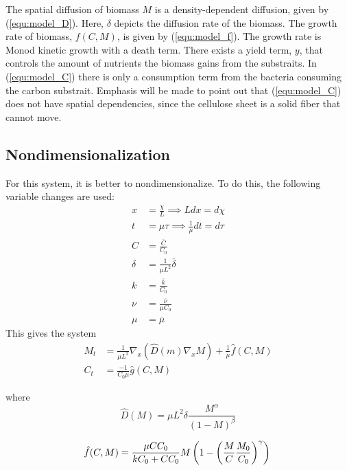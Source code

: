 \documentclass{llncs}
\begin{document}
  The spatial diffusion of biomass $M$ is a density-dependent diffusion, given by (\ref{equ:model_D}).
  Here, $\delta$ depicts the diffusion rate of the biomass.
  The growth rate of biomass, ${f}({C},M)$, is given by (\ref{equ:model_f}). 
  The growth rate is Monod kinetic growth with a death term.
  There exists a yield term, $y$, that controls the amount of nutrients the biomass gains from the substraits. 
  In (\ref{equ:model_C}) there is only a consumption term from the bacteria consuming the carbon substrait. 
  Emphasis will be made to point out that (\ref{equ:model_C}) does not have spatial dependencies, since the cellulose sheet is a solid fiber that cannot move.
  
  \subsection {Nondimensionalization}
  For this system, it is better to nondimensionalize. To do this, the following variable changes are used:
  \begin{align}
    x &= \frac{\chi}{L} \implies L dx = d\chi\\
    t &= \mu \tau \implies \frac{1}{\mu} dt= d\tau\\
    C &= \frac{\overline{C}}{C_0} \\
    \delta &= \frac{1}{\mu L^2} \overline{\delta} \\
    k &= \frac{\overline{k}}{C_0} \\
    \nu &= \frac{\overline{\nu}}{\mu C_0} \\
    \mu &= \overline{\mu}
  \end{align}
  This gives the system
  \begin{align}
    M_t &= \frac{1}{\mu L^2} \nabla_x \left(\hat{D}(m) \nabla_x M \right) + \frac{1}{\mu} \hat{f}(C,M) \\
    C_t &= \frac{ -1}{C_0 \mu} \hat{g}(C,M)
  \end{align}
  
  where 
  \begin{equation}
    \hat{D}(M) = {\mu L^2 \delta} \frac{M^\alpha}{(1-M)^\beta}
  \end{equation}
  
  \begin{equation}
    \hat{f}({C},M) = \frac{{\mu} {C C_0}}{{k C_0} + {C C_0}} M \left(1 - \left( \frac{M}{{C}} \frac{M_0}{C_0} \right)^\gamma \right) \\
  \end{equation}
  
\end{document}
